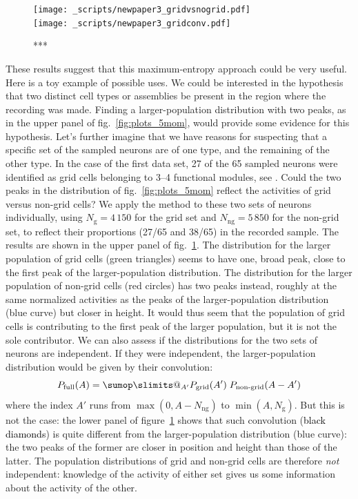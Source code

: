 \documentclass[\ifafour a4paper,12pt,\else a5paper,10pt,\fi%
onecolumn,oneside,article,%
british%
]{memoir}
\makeatletter
\theoremstyle{remark}
\theoremstyle{innote}
\def\sum{\DOTSI\sumop\slimits@}
\DeclarePairedDelimiter\set{\{}{\}}
\renewcommand*{\|}{\nonscript\,\vert\nonscript\;\mathopen{}}
\newcommand*{\fig}{fig.}%
\newcommand*{\yAv}{A}
\newcommand*{\yNg}{N_{\text{g}}}
\newcommand*{\yNng}{N_{\text{ng}}}
\newcommand*{\yA}{\yAv}%
\makeatother
\begin{document}
\begin{figure}[!p]
\centering
\texttt{[image: \_scripts/newpaper3\_gridvsnogrid.pdf]}%
\\[3em]%
\texttt{[image: \_scripts/newpaper3\_gridconv.pdf]}%
\caption{***}
\label{fig:plots_cellsubsets}
\end{figure}
These results suggest that this maximum-entropy approach could be very
useful. Here is a toy example of possible uses. We could be interested in
the hypothesis that two distinct cell types or assemblies be present in the
region where the recording was made. Finding a larger-population distribution
with two peaks, as in the upper panel of \fig~\ref{fig:plots_5mom}, would
provide some evidence for this hypothesis. Let's further imagine that we
have reasons for suspecting that a specific set of the sampled neurons are
of one type, and the remaining of the other type. In the case of the first
data set, 27 of the 65 sampled neurons were identified as grid cells
belonging to 3--4 functional modules, see \cite{dunnetal2015}. Could the
two peaks in the distribution of \fig~\ref{fig:plots_5mom} reflect the
activities of grid versus non-grid cells? We apply the method to these two
sets of neurons individually, using $\yNg=4\,150$ for the grid set and
$\yNng=5\,850$ for the non-grid set, to reflect their proportions (27/65
and 38/65) in the recorded sample. The results are shown in the upper panel
of \fig~\ref{fig:plots_cellsubsets}. The distribution for the larger
population of grid cells (\textcolor{mygreen}{green triangles}) seems to
have one, broad peak, close to the first peak of the larger-population
distribution. The distribution for the larger population of non-grid cells
(\textcolor{myred}{red circles}) has two peaks instead, roughly at the same
normalized activities as the peaks of the larger-population distribution
(\textcolor{myblue}{blue curve}) but closer in height. It would thus seem
that the population of grid cells is contributing to the first peak of the
larger population, but it is not the sole contributor. We can also assess if
the distributions for the two sets of neurons are independent. If they were
independent, the larger-population distribution would be given by their
convolution:
\begin{equation}
  \label{eq:convolution}
  P_{\text{full}}(\yA) = \sum_{\yA'} P_{\text{grid}}(\yA')\;
  P_{\text{non-grid}}(\yA-\yA') %
\end{equation}
where the index $\yA'$ runs from $\max(0,\yA-\yNng)$ to $\min(\yA,\yNg)$.
But this is not the case: the lower panel of
figure~\ref{fig:plots_cellsubsets} shows that such convolution
(\textcolor{black}{black diamonds}) is quite different from the
larger-population distribution (\textcolor{myblue}{blue curve}): the two
peaks of the former are closer in position and height than those of the
latter. The population distributions of grid and non-grid cells are
therefore \emph{not} independent: knowledge of the activity of either set
gives us some information about the activity of the other.
\end{document}
